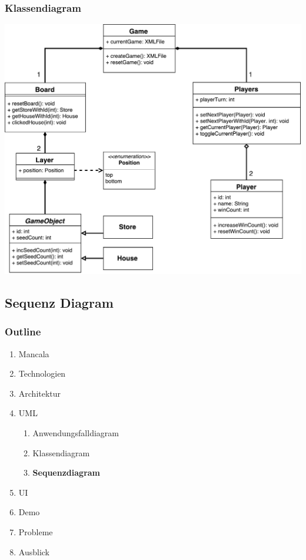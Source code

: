 \documentclass[
	10pt,
	t		%
]{beamer}
\begin{document}
\begin{frame}
\frametitle{Klassendiagram}
\begin{center}
\includegraphics[scale=0.32]{./../Diagrams/Classes.pdf}
\end{center}
\end{frame}

\subsection{Sequenz Diagram}
\begin{frame}
\frametitle{Outline}
\begin{enumerate}
\item Mancala
\item Technologien
\item Architektur
\item UML
\begin{enumerate}
\item Anwendungsfalldiagram
\item Klassendiagram
\item \textbf{Sequenzdiagram}
\end{enumerate}
\item UI
\item Demo
\item Probleme
\item Ausblick
\end{enumerate}
\end{frame}
\end{document}
